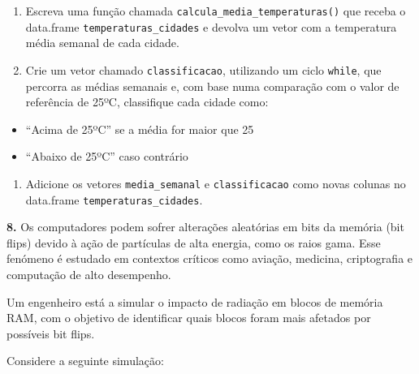 \documentclass[
]{book}
\providecommand{\tightlist}{%
  \setlength{\itemsep}{0pt}\setlength{\parskip}{0pt}}
\begin{document}
\begin{enumerate}
\def\labelenumi{(\alph{enumi})}
\item
  Escreva uma função chamada \texttt{calcula\_media\_temperaturas()} que receba o data.frame \texttt{temperaturas\_cidades} e devolva um vetor com a temperatura média semanal de cada cidade.
\item
  Crie um vetor chamado \texttt{classificacao}, utilizando um ciclo \texttt{while}, que percorra as médias semanais e, com base numa comparação com o valor de referência de 25ºC, classifique cada cidade como:
\end{enumerate}

\begin{itemize}
\tightlist
\item
  ``Acima de 25ºC'' se a média for maior que 25
\item
  ``Abaixo de 25ºC'' caso contrário
\end{itemize}

\begin{enumerate}
\def\labelenumi{(\alph{enumi})}
\setcounter{enumi}{2}
\tightlist
\item
  Adicione os vetores \texttt{media\_semanal} e \texttt{classificacao} como novas colunas no data.frame \texttt{temperaturas\_cidades}.
\end{enumerate}

\textbf{8.} Os computadores podem sofrer alterações aleatórias em bits da memória (bit flips) devido à ação de partículas de alta energia, como os raios gama. Esse fenómeno é estudado em contextos críticos como aviação, medicina, criptografia e computação de alto desempenho.

Um engenheiro está a simular o impacto de radiação em blocos de memória RAM, com o objetivo de identificar quais blocos foram mais afetados por possíveis bit flips.

Considere a seguinte simulação:
\end{document}
